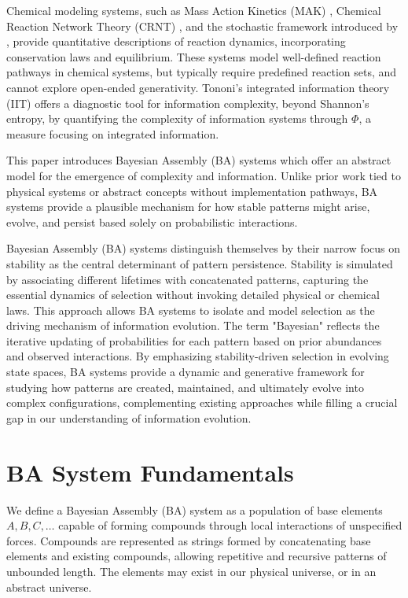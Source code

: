 \documentclass[preprint,12pt]{elsarticle}
\begin{document}
Chemical modeling systems, such as Mass Action Kinetics (MAK) \cite{TuranyiTomlin2014}, Chemical Reaction Network Theory (CRNT) \cite{feinberg1987chemical}, and the stochastic framework introduced by \cite{arxiv:q-bio0501016} \cite{DittrichFenizio2005}, provide quantitative descriptions of reaction dynamics, incorporating conservation laws and equilibrium. These systems model well-defined reaction pathways in chemical systems, but typically require predefined reaction sets, and cannot explore open-ended generativity. Tononi's integrated information theory (IIT) \cite{tononi2008phi} offers a diagnostic tool for information complexity, beyond Shannon's entropy, by quantifying the complexity of information systems through $\Phi$, a measure focusing on integrated information.

This paper introduces Bayesian Assembly (BA) systems which offer an abstract model for the emergence of complexity and information. Unlike prior work tied to physical systems or abstract concepts without implementation pathways, BA systems provide a plausible mechanism for how stable patterns might arise, evolve, and persist based solely on probabilistic interactions.

Bayesian Assembly (BA) systems distinguish themselves by their narrow focus on stability as the central determinant of pattern persistence. Stability is simulated by associating different lifetimes with concatenated patterns, capturing the essential dynamics of selection without invoking detailed physical or chemical laws. This approach allows BA systems to isolate and model selection as the driving mechanism of information evolution. The term "Bayesian" \cite{mcgrayne2011theory} reflects the iterative updating of probabilities for each pattern based on prior abundances and observed interactions. By emphasizing stability-driven selection in evolving state spaces, BA systems provide a dynamic and generative framework for studying how patterns are created, maintained, and ultimately evolve into complex configurations, complementing existing approaches while filling a crucial gap in our understanding of information evolution.

\section{BA System Fundamentals}

We define a Bayesian Assembly (BA) system as a population of base elements \( A, B, C, \dots \) capable of forming compounds through local interactions of unspecified forces. Compounds are represented as strings formed by concatenating base elements and existing compounds, allowing repetitive and recursive patterns of unbounded length. The elements may exist in our physical universe, or in an abstract universe. 
\end{document}
